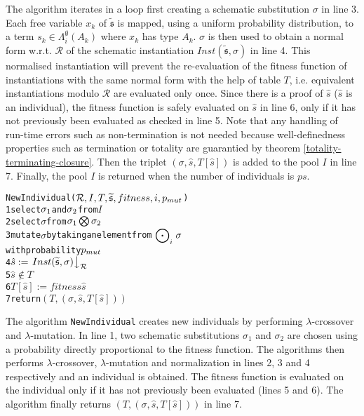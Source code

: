 The algorithm iterates in a loop first creating a schematic substitution $\sigma$ in line 3. Each free variable $x_k$ of $\widetilde{\mathfrak{s}}$ is mapped, using a uniform probability distribution, to a term $s_k \in \Lambda_i^{\emptyset}(A_k)$ where $x_k$ has type $A_k$. $\sigma$ is then used to obtain a normal form w.r.t. $\mathcal{R}$ of the schematic instantiation $Inst(\widetilde{\mathfrak{s}},\sigma)$ in line 4. This normalised instantiation will prevent the re-evaluation of the fitness function of instantiations with the same normal form with the help of table $T$, i.e. equivalent instantiations modulo $\mathcal{R}$ are evaluated only once. Since there is a proof of $\hat{s}$ ($\hat{s}$ is an individual), the fitness function is safely evaluated on $\hat{s}$ in line 6, only if it has not previously been evaluated as checked in line 5. Note that any handling of run-time errors such as non-termination is not needed because well-definedness properties such as termination or totality are guarantied by theorem \ref{totality-terminating-closure}. Then the triplet $(\sigma,\hat{s},T[\hat{s}])$ is added to the pool $I$ in line 7. Finally, the pool $I$ is returned when the number of individuals is $ps$.

\begin{alltt}
   NewIndividual(\(\mathcal{R},I,T,\widetilde{\mathfrak{s}},fitness,i,p\sb{mut}\))
1  select \(\sigma\sb{1}\) and \(\sigma\sb{2}\) from \(I\)
2  select \(\sigma\) from \(\sigma\sb{1}\bigotimes\sigma\sb{2}\)
3  mutate \(\sigma\) by taking an element from \(\Mutationtmp{i}\sigma\)
            with probability \(p\sb{mut}\)
4  \(\hat{s}:=\normal{Inst(\widetilde{\mathfrak{s}},\sigma)}{\mathcal{R}}\)
5   \(\hat{s}\not\in{T}\) 
6    \(T[\hat{s}]:=fitness \hat{s}\)
7  return \((T,(\sigma,\hat{s},T[\hat{s}]))\)
\end{alltt}

The algorithm \texttt{NewIndividual} creates new individuals by performing $\lambda$-crossover and $\lambda$-mutation. In line 1, two schematic substitutions $\sigma_1$ and $\sigma_2$ are chosen using a probability directly proportional to the fitness function. The algorithms then performs $\lambda$-crossover, $\lambda$-mutation and normalization in lines 2, 3 and 4 respectively and an individual is obtained. The fitness function is evaluated on the individual only if it has not previously been evaluated (lines 5 and 6). The algorithm finally returns $(T,(\sigma,\hat{s},T[\hat{s}]))$ in line 7.

